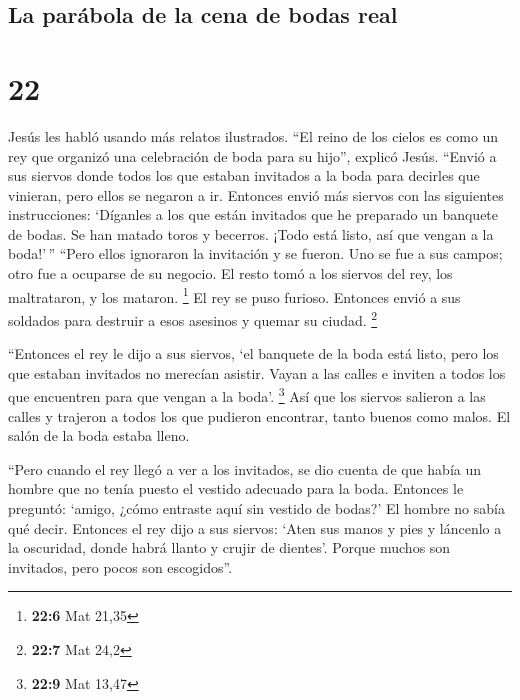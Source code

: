 \hypertarget{la-paruxe1bola-de-la-cena-de-bodas-real}{%
\subsection{La parábola de la cena de bodas
real}\label{la-paruxe1bola-de-la-cena-de-bodas-real}}

\hypertarget{section-21}{%
\section{22}\label{section-21}}

 Jesús les habló usando más relatos ilustrados.
 ``El reino de los cielos es como un rey que organizó una
celebración de boda para su hijo'', explicó Jesús. 
``Envió a sus siervos donde todos los que estaban invitados a la boda
para decirles que vinieran, pero ellos se negaron a ir. 
Entonces envió más siervos con las siguientes instrucciones: `Díganles a
los que están invitados que he preparado un banquete de bodas. Se han
matado toros y becerros. ¡Todo está listo, así que vengan a la
boda!'\,''  ``Pero ellos ignoraron la invitación y se
fueron. Uno se fue a sus campos; otro fue a ocuparse de su negocio.
 El resto tomó a los siervos del rey, los maltrataron, y
los mataron. \footnote{\textbf{22:6} Mat 21,35}  El rey se
puso furioso. Entonces envió a sus soldados para destruir a esos
asesinos y quemar su ciudad. \footnote{\textbf{22:7} Mat 24,2}

 ``Entonces el rey le dijo a sus siervos, `el banquete de
la boda está listo, pero los que estaban invitados no merecían asistir.
 Vayan a las calles e inviten a todos los que encuentren
para que vengan a la boda'. \footnote{\textbf{22:9} Mat 13,47}
 Así que los siervos salieron a las calles y trajeron a
todos los que pudieron encontrar, tanto buenos como malos. El salón de
la boda estaba lleno.

 ``Pero cuando el rey llegó a ver a los invitados, se dio
cuenta de que había un hombre que no tenía puesto el vestido adecuado
para la boda.  Entonces le preguntó: `amigo, ¿cómo
entraste aquí sin vestido de bodas?' El hombre no sabía qué decir.
 Entonces el rey dijo a sus siervos: `Aten sus manos y
pies y láncenlo a la oscuridad, donde habrá llanto y crujir de dientes'.
 Porque muchos son invitados, pero pocos son escogidos''.

